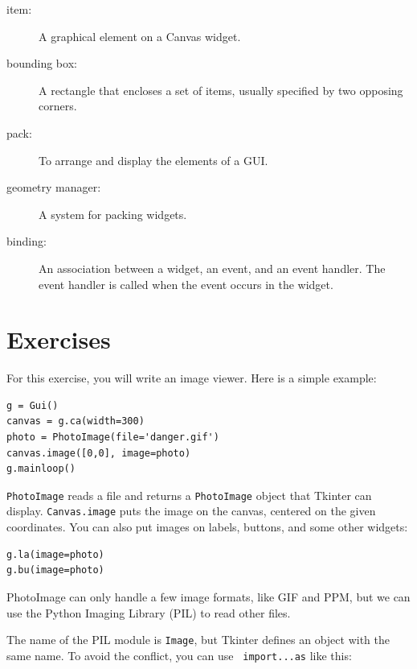\documentclass[10pt]{book}
\begin{document}
\begin{CJK}{UTF8}{gbsn}
\begin{description}
\item[item:] A graphical element on a Canvas widget.

\item[bounding box:] A rectangle that encloses a set of items,
usually specified by two opposing corners.

\item[pack:] To arrange and display the elements of a GUI.

\item[geometry manager:] A system for packing widgets.

\item[binding:] An association between a widget, an event, and
an event handler.  The event handler is called when the event
occurs in the widget.

\end{description}


\section{Exercises}

\begin{exercise}

For this exercise, you will write an image viewer.  Here is
a simple example:

\begin{verbatim}
g = Gui()
canvas = g.ca(width=300)
photo = PhotoImage(file='danger.gif')
canvas.image([0,0], image=photo)
g.mainloop()
\end{verbatim}
%
{\tt PhotoImage} reads a file and returns a {\tt PhotoImage} object
that Tkinter can display.  {\tt Canvas.image} puts the image on the
canvas, centered on the given coordinates.  You can also put images on
labels, buttons, and some other widgets:

\begin{verbatim}
g.la(image=photo)
g.bu(image=photo)
\end{verbatim}
%
PhotoImage can only handle a few image formats, like GIF and PPM, 
but we can use the Python Imaging Library (PIL) to read other
files.

The name of the PIL module is {\tt Image}, but Tkinter defines an
object with the same name.  To avoid the conflict, you can use {\tt
  import...as} like this:


\end{exercise}
\end{CJK}
\end{document}
